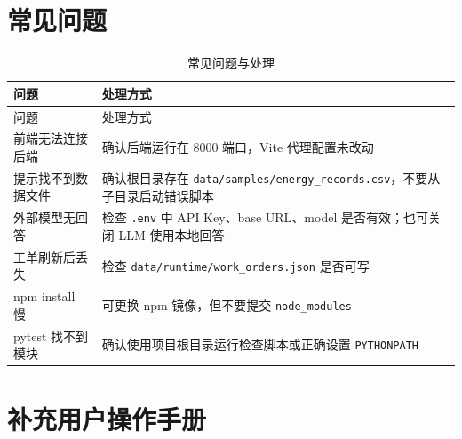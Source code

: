 \documentclass[12pt,a4paper]{ctexart}
\newcommand{\code}[1]{{\footnotesize\nolinkurl{#1}}}
\begin{document}
\section{常见问题}
\begin{longtable}{p{4cm}p{9.8cm}}
\caption{常见问题与处理}\\
\toprule
问题 & 处理方式 \\
\midrule
\endfirsthead
\toprule
问题 & 处理方式 \\
\midrule
\endhead
前端无法连接后端 & 确认后端运行在 8000 端口，Vite 代理配置未改动 \\
提示找不到数据文件 & 确认根目录存在 \code{data/samples/energy_records.csv}，不要从子目录启动错误脚本 \\
外部模型无回答 & 检查 \code{.env} 中 API Key、base URL、model 是否有效；也可关闭 LLM 使用本地回答 \\
工单刷新后丢失 & 检查 \code{data/runtime/work_orders.json} 是否可写 \\
npm install 慢 & 可更换 npm 镜像，但不要提交 \code{node_modules} \\
pytest 找不到模块 & 确认使用项目根目录运行检查脚本或正确设置 \code{PYTHONPATH} \\
\bottomrule
\end{longtable}

\clearpage
\section{补充用户操作手册}
\end{document}
